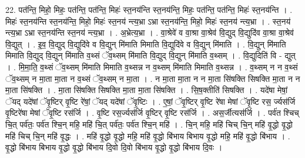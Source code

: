 \documentclass[17pt]{extarticle}
\begin{document}
22. पत॑न्ति॒ मिहो॒ मिहः॒ पत॑न्ति॒ पत॑न्ति॒ मिहः॑ स्त॒नय॑न्ति स्त॒नय॑न्ति॒ मिहः॒ पत॑न्ति॒ पत॑न्ति॒ मिहः॑ स्त॒नय॑न्ति । . मिहः॑ स्त॒नय॑न्ति स्त॒नय॑न्ति॒ मिहो॒ मिहः॑ स्त॒नय॑ न्त्य॒भ्रा ऽभ्रा स्त॒नय॑न्ति॒ मिहो॒ मिहः॑ स्त॒नय॑ न्त्य॒भ्रा । . स्त॒नय॑ न्त्य॒भ्रा ऽभ्रा स्त॒नय॑न्ति स्त॒नय॑ न्त्य॒भ्रा । . अ॒भ्रेत्य॒भ्रा । . वा॒श्रेवे॑ व वा॒श्रा वा॒श्रेव॑ वि॒द्युद् वि॒द्युदि॑व वा॒श्रा वा॒श्रेव॑ वि॒द्युत् । . इ॒व॒ वि॒द्युद् वि॒द्युदि॑वे व वि॒द्युन् मि॑माति मिमाति वि॒द्युदि॑वे व वि॒द्युन् मि॑माति । . वि॒द्युन् मि॑माति मिमाति वि॒द्युद् वि॒द्युन् मि॑माति व॒थ्सं ॅव॒थ्सम् मि॑माति वि॒द्युद् वि॒द्युन् मि॑माति व॒थ्सम् । . वि॒द्युदिति॑ वि - द्युत् । . मि॒मा॒ति॒ व॒थ्सं ॅव॒थ्सम् मि॑माति मिमाति व॒थ्सन्न न व॒थ्सम् मि॑माति मिमाति व॒थ्सन्न । . व॒थ्सम् न न व॒थ्सं ॅव॒थ्सम् न मा॒ता मा॒ता न व॒थ्सं ॅव॒थ्सम् न मा॒ता । . न मा॒ता मा॒ता न न मा॒ता सि॑षक्ति सिषक्ति मा॒ता न न मा॒ता सि॑षक्ति । . मा॒ता सि॑षक्ति सिषक्ति मा॒ता मा॒ता सि॑षक्ति । . सि॒ष॒क्तीति॑ सिषक्ति । . यदे॑षा मेषां॒ ॅयद् यदे॑षां ॅवृ॒ष्टिर् वृ॒ष्टि रे॑षां॒ ॅयद् यदे॑षां ॅवृ॒ष्टिः । . ए॒षां॒ ॅवृ॒ष्टिर् वृ॒ष्टि रे॑षा मेषां ॅवृ॒ष्टि रस॒ र्ज्यस॑र्जि वृ॒ष्टिरे॑षा मेषां ॅवृ॒ष्टि रस॑र्जि । . वृ॒ष्टि रस॒र्ज्यस॑र्जि वृ॒ष्टिर् वृ॒ष्टि रस॑र्जि । . अस॒र्जीत्यस॑र्जि । . पर्व॑त श्चिच् चि॒त् पर्व॑तः॒ पर्व॑त श्चि॒न् महि॒ महि॑ चि॒त् पर्व॑तः॒ पर्व॑त श्चि॒न् महि॑ । . चि॒न् महि॒ महि॑ चिच् चि॒न् महि॑ वृ॒द्धो वृ॒द्धो महि॑ चिच् चि॒न् महि॑ वृ॒द्धः । . महि॑ वृ॒द्धो वृ॒द्धो महि॒ महि॑ वृ॒द्धो बि॑भाय बिभाय वृ॒द्धो महि॒ महि॑ वृ॒द्धो बि॑भाय । . वृ॒द्धो बि॑भाय बिभाय वृ॒द्धो वृ॒द्धो बि॑भाय दि॒वो दि॒वो बि॑भाय वृ॒द्धो वृ॒द्धो बि॑भाय दि॒वः । \newline
\end{document}
